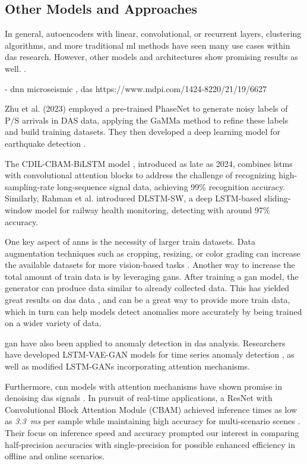 \subsection{Other Models and Approaches}



In general, autoencoders with linear, convolutional, or recurrent layers, clustering algorithms, and more traditional \acrshort{ml} methods have seen many use cases within \acrshort{das} research. However,  other models and architectures show promising results as well. \cite{goodfellow2014generative, goodfellow2016nips}.


\cite{s21196627} - dnn microseismic , das
https://www.mdpi.com/1424-8220/21/19/6627

Zhu et al. (2023) employed a pre-trained PhaseNet to generate noisy labels of P/S arrivals in DAS data, applying the GaMMa method to refine these labels and build training datasets. They then developed a deep learning model for earthquake detection \cite{zhu2023seismic}.

The CDIL-CBAM-BiLSTM model \cite{wang2024deep}, introduced as late as 2024, combines \acrshort{lstm}s with convolutional attention blocks to address the challenge of recognizing high-sampling-rate long-sequence signal data, achieving 99\% recognition accuracy. Similarly, Rahman et al. \cite{10.1115/JRC2024-124137} introduced DLSTM-SW, a deep LSTM-based sliding-window model for railway health monitoring, detecting with around 97\% accuracy.

One key aspect of \acrshort{ann}s is the necessity of larger train datasets. Data augmentation techniques such as cropping, resizing, or color grading can increase the available datasets for more vision-based tasks \cite{shorten2019survey}. Another way to increase the total amount of train data is by leveraging \acrshort{gan}s. After training a \acrshort{gan} model, the generator can produce data similar to already collected data. This has yielded great results on \acrshort{das} data \cite{Shiloh:19}, and can be a great way to provide more train data, which in turn can help models detect anomalies more accurately by being trained on a wider variety of data.

\acrshort{gan} have also been applied to anomaly detection in \acrshort{das} analysis. Researchers have developed LSTM-VAE-GAN models for time series anomaly detection \cite{s20133738}, as well as modified LSTM-GANs incorporating attention mechanisms. 

Furthermore, \acrshort{cnn} models with attention mechanisms have shown promise in denoising \acrshort{das} signals \cite{eage:/content/journals/10.1111/1365-2478.13355}. In pursuit of real-time applications, a ResNet with Convolutional Block Attention Module (CBAM) achieved inference times as low as \textit{\qty{3.3}{\milli\second}} per sample while maintaining high accuracy for multi-scenario scenes \cite{photonics9100677}. Their focus on inference speed and accuracy prompted our interest in comparing half-precision accuracies with single-precision for possible enhanced efficiency in offline and online scenarios.

